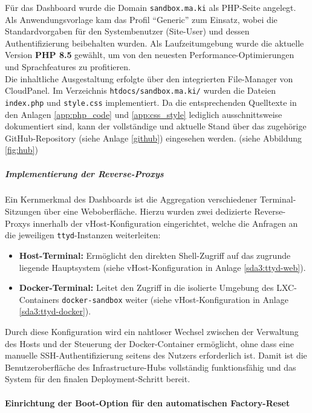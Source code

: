 \documentclass[11pt,
a4paper,
numbers=nonperiod,
footsepline,
oneside,
numbers=noenddot,
bibliography=totoc
]{scrartcl}
\begin{document}
Für das Dashboard wurde die Domain \texttt{sandbox.ma.ki} als PHP-Seite angelegt. Als Anwendungsvorlage kam das Profil "`Generic"' zum Einsatz, wobei die Standardvorgaben für den Systembenutzer (Site-User) und dessen Authentifizierung beibehalten wurden. Als Laufzeitumgebung wurde die aktuelle Version \textbf{PHP 8.5} gewählt, um von den neuesten Performance-Optimierungen und Sprachfeatures zu profitieren.\\

Die inhaltliche Ausgestaltung erfolgte über den integrierten File-Manager von CloudPanel. Im Verzeichnis \texttt{htdocs/sandbox.ma.ki/} wurden die Dateien \texttt{index.php} und \texttt{style.css} implementiert. Da die entsprechenden Quelltexte in den Anlagen \ref{app:php_code} und \ref{app:css_style} lediglich ausschnittsweise dokumentiert sind, kann der vollständige und aktuelle Stand über das zugehörige GitHub-Repository (siehe Anlage \ref{github}) eingesehen werden. (siehe Abbildung \ref{fig:hub})

\subparagraph{Implementierung der Reverse-Proxys}
Ein Kernmerkmal des Dashboards ist die Aggregation verschiedener Terminal-Sitzungen über eine Weboberfläche. Hierzu wurden zwei dedizierte Reverse-Proxys innerhalb der vHost-Konfiguration eingerichtet, welche die Anfragen an die jeweiligen \texttt{ttyd}-Instanzen weiterleiten:

\begin{itemize}
	\item \textbf{Host-Terminal:} Ermöglicht den direkten Shell-Zugriff auf das zugrunde liegende Hauptsystem (siehe vHost-Konfiguration in Anlage \ref{sda3:ttyd-web}).
	\item \textbf{Docker-Terminal:} Leitet den Zugriff in die isolierte Umgebung des LXC-Containers \linebreak\texttt{docker-sandbox} weiter (siehe vHost-Konfiguration in Anlage \ref{sda3:ttyd-docker}).
\end{itemize}
\bigskip
Durch diese Konfiguration wird ein nahtloser Wechsel zwischen der Verwaltung des Hosts und der Steuerung der Docker-Container ermöglicht, ohne dass eine manuelle SSH-Authentifizierung seitens des Nutzers erforderlich ist. Damit ist die Benutzeroberfläche des Infrastructure-Hubs vollständig funktionsfähig und das System für den finalen Deployment-Schritt bereit.

\paragraph{Einrichtung der Boot-Option für den automatischen Factory-Reset}
\end{document}
